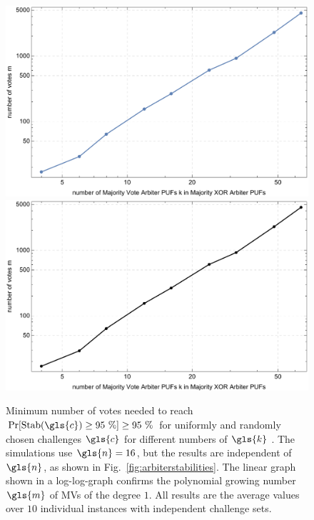 \begin{figure}[!ht]
\ifx{}\undefined
{}
\else
	\if{}
\centering
\includegraphics[width=1.00\textwidth]{images/votes-stab-simulation.pdf}
	\else
\includegraphics[width=1.00\textwidth]{images/votes-stab-simulation_mono.pdf} 
    \fi
\fi
\caption[Number of votes needed for large Majority \acs{XOR} \apufs]{Minimum number of votes needed to reach $\Pr[\protect\Stab(\gls{c}) \ge 95\ \%] \ge 95\ \%$ for uniformly and randomly chosen challenges $\gls{c}$ for different numbers of $\gls{k}$ \apufs. 
The simulations use $\gls{n} = 16$, but the results are independent of $\gls{n}$, as shown in Fig.\ \ref{fig:arbiterstabilities}. 
The linear graph shown in a log-log-graph confirms the polynomial growing number $\gls{m}$ of \acp{MV} of the degree $1$.
All results are the average values over $10$ individual \puf instances with independent challenge sets.} 
\label{fig:majorityvotegrowth}
\end{figure}

